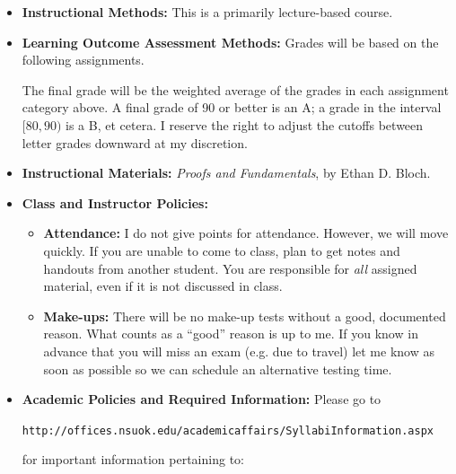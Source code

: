 \documentclass{article}
\begin{document}
\begin{itemize}
\item \textbf{Instructional Methods:} This is a primarily lecture-based course.


\item \textbf{Learning Outcome Assessment Methods:} Grades will be based on the following assignments.

The final grade will be the weighted average of the grades in each assignment category above. A final grade of 90 or better is an A; a grade in the interval $[80,90)$ is a B, et cetera. I reserve the right to adjust the cutoffs between letter grades downward at my discretion.


\item \textbf{Instructional Materials:} \emph{Proofs and Fundamentals}, by Ethan D. Bloch.


\item \textbf{Class and Instructor Policies:}
\begin{itemize}
\item \textbf{Attendance:} I do not give points for attendance. However, we will move quickly. If you are unable to come to class, plan to get notes and handouts from another student. You are responsible for \emph{all} assigned material, even if it is not discussed in class.

\item \textbf{Make-ups:} There will be no make-up tests without a good, documented reason. What counts as a ``good'' reason is up to me. If you know in advance that you will miss an exam (e.g. due to travel) let me know as soon as possible so we can schedule an alternative testing time.
\end{itemize}


\item \textbf{Academic Policies and Required Information:} Please go to 

\begin{center}
\texttt{http://offices.nsuok.edu/academicaffairs/SyllabiInformation.aspx}
\end{center}

for important information pertaining to:


\end{itemize}
\end{document}
